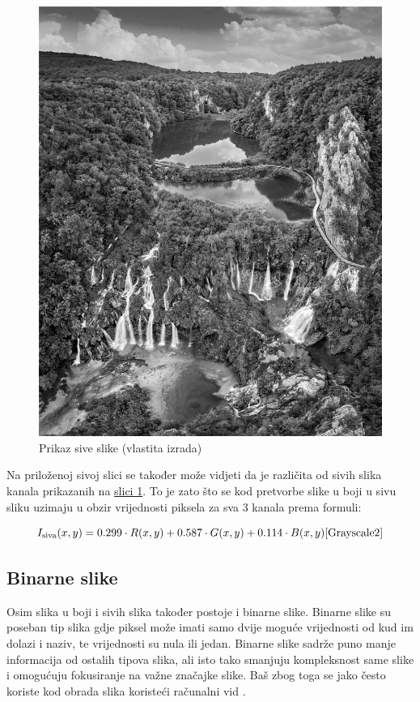 \documentclass{foi}
\begin{document}
\begin{figure}[H]
    \centering
    \includegraphics[width=0.7\linewidth]{slike/Grayscale.jpeg}
    \caption{Prikaz sive slike (vlastita izrada)}
\end{figure}

Na priloženoj sivoj slici se također može vidjeti da je različita od sivih slika kanala prikazanih na \hyperref[fig:channels]{slici 1}. To je zato što se kod pretvorbe slike u boji u sivu sliku uzimaju u obzir vrijednosti piksela za sva 3 kanala prema formuli:

{\large
\[
    I_{\text{siva}}(x, y) = 0.299 \cdot R(x, y) + 0.587 \cdot G(x, y) + 0.114 \cdot B(x, y)\text{\cite{Grayscale2}}
\]
}


\subsection{Binarne slike}

Osim slika u boji i sivih slika također postoje i binarne slike. Binarne slike su poseban tip slika gdje piksel može imati samo dvije moguće vrijednosti od kud im dolazi i naziv, te vrijednosti su nula ili jedan. Binarne slike sadrže puno manje informacija od ostalih tipova slika, ali isto tako smanjuju kompleksnost same slike i omogućuju fokusiranje na važne značajke slike. Baš zbog toga se jako često koriste kod obrada slika koristeći računalni vid \cite{GrayscaleSlika}.
\end{document}
